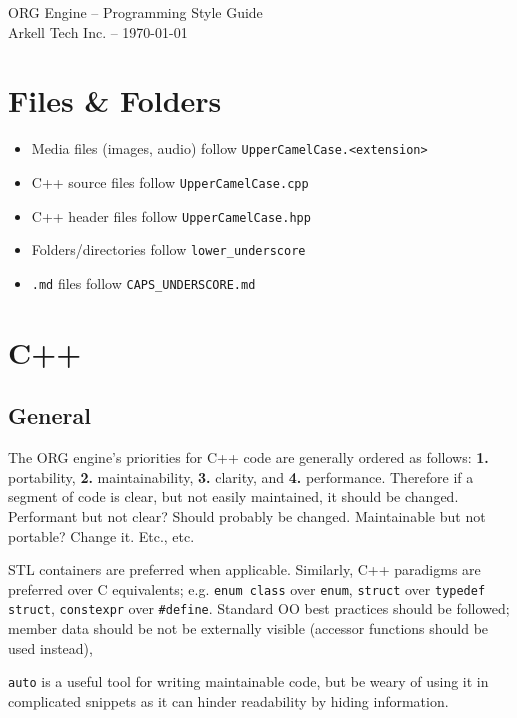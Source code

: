 \documentclass[12pt]{article}
\begin{document}
\begin{center}
\large{ORG Engine -- Programming Style Guide}\\
\normalsize{Arkell Tech Inc. -- \today}
\end{center}
\hrulefill

\section{Files \& Folders}

\begin{itemize}
\item Media files (images, audio) follow \texttt{UpperCamelCase.<extension>}
\item C++ source files follow \texttt{UpperCamelCase.cpp}
\item C++ header files follow \texttt{UpperCamelCase.hpp}
\item Folders/directories follow \texttt{lower\_underscore}
\item \texttt{.md} files follow \texttt{CAPS\_UNDERSCORE.md}
\end{itemize}

\section{C++}

\subsection{General}
The ORG engine's priorities for C++ code are generally ordered as follows: \textbf{1.} portability, \textbf{2.} maintainability, \textbf{3.} clarity, and \textbf{4.} performance. Therefore if a segment of code is clear, but not easily maintained, it should be changed. Performant but not clear? Should probably be changed. Maintainable but not portable? Change it. Etc., etc.

STL containers are preferred when applicable. Similarly, C++ paradigms are preferred over C equivalents; e.g. \texttt{enum class} over \texttt{enum}, \texttt{struct} over \texttt{typedef struct}, \texttt{constexpr} over \texttt{\#define}. Standard OO best practices should be followed; member data should be not be externally visible (accessor functions should be used instead),

\texttt{auto} is a useful tool for writing maintainable code, but be weary of using it in complicated snippets as it can hinder readability by hiding information. 
\end{document}
